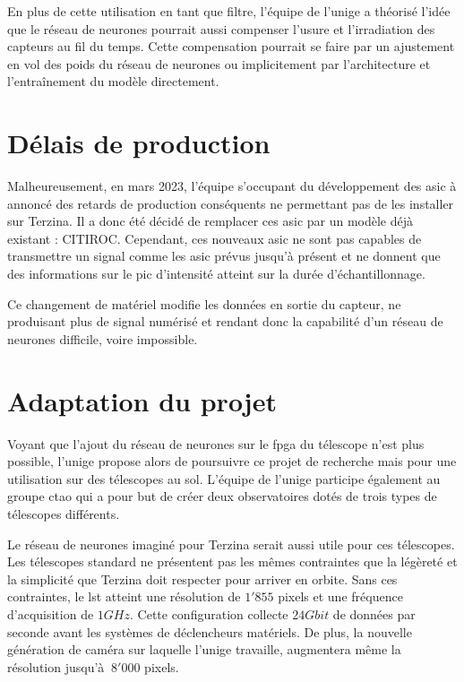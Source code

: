 En plus de cette utilisation en tant que filtre, l'équipe de l'\gls{unige} a théorisé l'idée que le réseau de neurones
pourrait aussi compenser l'usure et l'irradiation des capteurs au fil du temps. Cette compensation pourrait se faire par un ajustement en vol 
des poids du réseau de neurones ou implicitement par l'architecture et l'entraînement du modèle directement.

\section{Délais de production}

Malheureusement, en mars 2023, l'équipe s'occupant du développement des \gls{asic} à annoncé des retards de production conséquents ne permettant pas de les installer sur Terzina.
Il a donc été décidé de remplacer ces \gls{asic} par un modèle déjà existant : CITIROC. Cependant, ces nouveaux \gls{asic} ne sont pas capables 
de transmettre un signal comme les \gls{asic} prévus jusqu'à présent et ne donnent que des informations sur le pic d'intensité atteint sur la durée d'échantillonnage.


Ce changement de matériel modifie les données en sortie du capteur, ne produisant plus de signal numérisé et rendant donc la capabilité d'un réseau de neurones
difficile, voire impossible.

\section{Adaptation du projet}

Voyant que l'ajout du réseau de neurones sur le \gls{fpga} du télescope n'est plus possible, l'\gls{unige} propose alors de poursuivre 
ce projet de recherche mais pour une utilisation sur des télescopes au sol. L'équipe de l'\gls{unige} participe également au groupe \gls{ctao}
qui a pour but de créer deux observatoires dotés de trois types de télescopes différents.

Le réseau de neurones imaginé pour Terzina serait aussi utile pour ces télescopes.
Les télescopes standard ne présentent pas les mêmes contraintes que la légèreté et la simplicité que Terzina doit respecter pour arriver en orbite.
Sans ces contraintes, le \gls{lst} atteint une résolution de $1'855$ pixels et une fréquence d'acquisition de $1 GHz$. 
Cette configuration collecte $24 Gbit$ de données par seconde avant les systèmes de déclencheurs matériels. \cite{LSTSpecifications}
De plus, la nouvelle génération de caméra sur laquelle l'\gls{unige} travaille, augmentera même la résolution jusqu'à $~8'000$ pixels.


